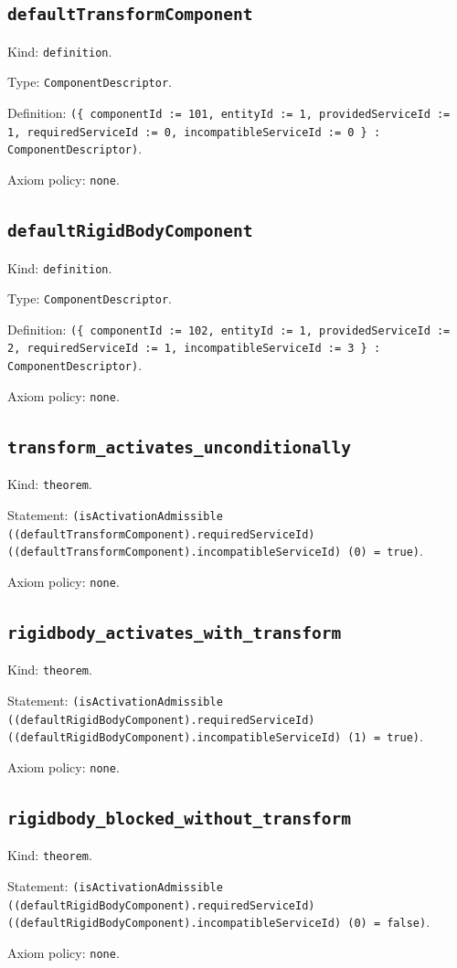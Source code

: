 \documentclass[11pt]{article}
\begin{document}
\subsection*{\texttt{defaultTransformComponent}}
\noindent Kind: \texttt{definition}.\par
\noindent Type: \texttt{ComponentDescriptor}.\par
\noindent Definition: \texttt{(\{ componentId := 101, entityId := 1, providedServiceId := 1, requiredServiceId := 0, incompatibleServiceId := 0 \} : ComponentDescriptor)}.\par
\noindent Axiom policy: \texttt{none}.\par
\subsection*{\texttt{defaultRigidBodyComponent}}
\noindent Kind: \texttt{definition}.\par
\noindent Type: \texttt{ComponentDescriptor}.\par
\noindent Definition: \texttt{(\{ componentId := 102, entityId := 1, providedServiceId := 2, requiredServiceId := 1, incompatibleServiceId := 3 \} : ComponentDescriptor)}.\par
\noindent Axiom policy: \texttt{none}.\par
\subsection*{\texttt{transform\_activates\_unconditionally}}
\noindent Kind: \texttt{theorem}.\par
\noindent Statement: \texttt{(isActivationAdmissible ((defaultTransformComponent).requiredServiceId) ((defaultTransformComponent).incompatibleServiceId) (0) = true)}.\par
\noindent Axiom policy: \texttt{none}.\par
\subsection*{\texttt{rigidbody\_activates\_with\_transform}}
\noindent Kind: \texttt{theorem}.\par
\noindent Statement: \texttt{(isActivationAdmissible ((defaultRigidBodyComponent).requiredServiceId) ((defaultRigidBodyComponent).incompatibleServiceId) (1) = true)}.\par
\noindent Axiom policy: \texttt{none}.\par
\subsection*{\texttt{rigidbody\_blocked\_without\_transform}}
\noindent Kind: \texttt{theorem}.\par
\noindent Statement: \texttt{(isActivationAdmissible ((defaultRigidBodyComponent).requiredServiceId) ((defaultRigidBodyComponent).incompatibleServiceId) (0) = false)}.\par
\noindent Axiom policy: \texttt{none}.\par
\end{document}
